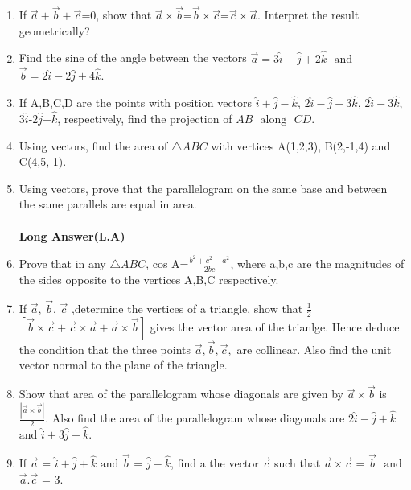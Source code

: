 \documentclass{article}
\providecommand{\abs}[1]{\left\vert#1\right\vert}
\begin{document}
\begin{enumerate}
\item If $\vec{a}+\vec{b}+\vec{c}$=0, show that $\vec{a}\times\vec{b}$=$\vec{b}\times\vec{c}$=$\vec{c}\times\vec{a}$. Interpret the result geometrically?



\item Find the sine of the angle between the vectors $\vec{a}=3\hat{i}+\hat{j}+2\hat{k}$ $\text{ and }$ $\vec{b}=2\hat{i}-2\hat{j}+4\hat{k}$.


\item If A,B,C,D  are the points with position vectors $\hat{i}+\hat{j}-\hat{k}$, $2\hat{i}-\hat{j}+3\hat{k}$, $2\hat{i}-3\hat{k}$, $3\hat{i}$-$2\hat{j}$+$\hat{k}$, respectively, find the projection of $\overline{AB}$ $\text{ along }$ $\overline{CD}$.


\item Using vectors, find the area of $\triangle{ABC}$ with vertices A(1,2,3), B(2,-1,4) and C(4,5,-1).


\item Using vectors, prove that the parallelogram on the same base and between the same parallels are equal in area.
\\
\\
\textbf{Long Answer(L.A)}
\item Prove that in any $\triangle{ABC}$, cos A=$\frac{b^2+c^2-a^2}{2bc}$, where a,b,c are the magnitudes of the sides opposite to the vertices A,B,C respectively.


\item If $\vec{a}$, $\vec{b}$, $\vec{c}$ ,determine the vertices of a triangle, show that $\frac{1}{2}$ $\left[\vec{b} \times\vec{c}+\vec{c} \times\vec{a}+\vec{a}\times\vec{b} \right]$ gives the vector area of the trianlge. Hence deduce the condition that the three points $\vec{a},\vec{b},\vec{c},$ are collinear. Also find the unit vector normal to the plane of the triangle.

\item Show that area of the parallelogram whose diagonals are given by $\vec{a}\times\vec{b}$ is $\frac{\abs{\vec{a}\times\vec{b}}}{2}$. Also find the area of the parallelogram whose diagonals are $2\hat{i}-\hat{j}+\hat{k}$ $\text{and}$ $\hat{i}+3\hat{j}-\hat{k}$.


\item If $\vec{a}$ = $\hat{i}+\hat{j}+\hat{k}$ $\text{and}$ $\vec{b}$ = $\hat{j}-\hat{k}$, find a the vector $\vec{c}$ such that $\vec{a}\times\vec{c}$ = $\vec{b}$ $\text{ and}$ $\vec{a}$.$\vec{c}$ = 3.


\end{enumerate}
\end{document}
